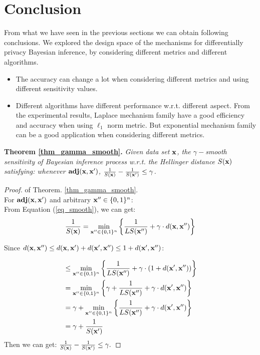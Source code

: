 \documentclass{article}
\begin{document}
\section{Conclusion}
From what we have seen in the previous sections we can obtain following conclusions. We explored the design space of the mechanisms for differentially privacy Bayesian inference, by considering different metrics and different algorithms.
\begin{itemize}
  \item The accuracy can change a lot when considering different metrics and using different sensitivity values.
  \item Different algorithms have different performance w.r.t. different aspect. From the experimental results, Laplace mechanism family have a good efficiency and accuracy when using $\ell_1$ norm metric. But exponential mechanism family can be a good application when considering different metrics.
\end{itemize}





\appendix

\noindent \textbf{Theorem \ref{thm_gamma_smooth}.}
\emph{
Given data set $\textbf{x}$, the $\gamma -$smooth sensitivity of Bayesian inference process w.r.t. the Hellinger distance $S(\textbf{x})$ satisfying:%
whenever $\textbf{adj}(\textbf{x},\textbf{x}')$, 
$\frac{1}{S(\textbf{x})} - \frac{1}{S(\textbf{x}')} \leq \gamma$.
}

\begin{proof}
of Theorem. \ref{thm_gamma_smooth}.\\
For $\textbf{adj}(\textbf{x},\textbf{x}')$ and arbitrary $\textbf{x}'' \in \{0,1\}^{n}$:\\
From Equation (\ref{eq_smooth}), we can get:
\[
\frac{1}{S(\textbf{x})} 
 = \min_{\textbf{x}'' \in \{0,1\}^{n}}\bigg \{ \frac{1}{LS(\textbf{x}'')} +\gamma \cdot d(\textbf{x},\textbf{x}'') \bigg \}\\
\]

Since $d(\textbf{x},\textbf{x}'') \leq d(\textbf{x},\textbf{x}') + d(\textbf{x}',\textbf{x}'') \leq 1 + d(\textbf{x}',\textbf{x}'')$:

\begin{equation*}
\begin{split}
& \leq \min_{\textbf{x}'' \in \{0,1\}^{n}}\bigg \{  \frac{1}{LS(\textbf{x}'')} +\gamma \cdot (1 + d(\textbf{x}',\textbf{x}'')) \bigg \}\\
& = \min_{\textbf{x}'' \in \{0,1\}^{n}}\bigg \{
\gamma + \frac{1}{LS(\textbf{x}'')} +\gamma \cdot d(\textbf{x}',\textbf{x}'')\bigg 
\}\\
& = \gamma + \min_{\textbf{x}'' \in \{0,1\}^{n}}\bigg \{
\frac{1}{LS(\textbf{x}'')} +\gamma \cdot d(\textbf{x}',\textbf{x}'')\bigg
\}\\
& = \gamma + \frac{1}{S(\textbf{x}')}
\end{split}
\end{equation*}
Then we can get:
$\frac{1}{S(\textbf{x})} - \frac{1}{S(\textbf{x}')} \leq \gamma.$
\end{proof}
\end{document}
